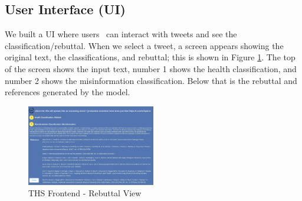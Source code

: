 \subsection{User Interface (UI)}
We built a UI where users  can interact with tweets and see the classification/rebuttal. When we select a tweet, a screen appears showing the original text, the classifications, and rebuttal; this is shown in Figure \ref{fig:frontendrebuttal}. The top of the screen shows the input text, number 1 shows the health classification, and number 2 shows the misinformation classification. Below that is the rebuttal and references generated by the model. %
\begin{figure}[H]
	\begin{center}
		\includegraphics[width=0.5\textwidth]{figures/THS_Rebuttal_view.jpeg} %
	\end{center}
	\caption{THS Frontend  - Rebuttal View} %
	\label{fig:frontendrebuttal}
\end{figure}






